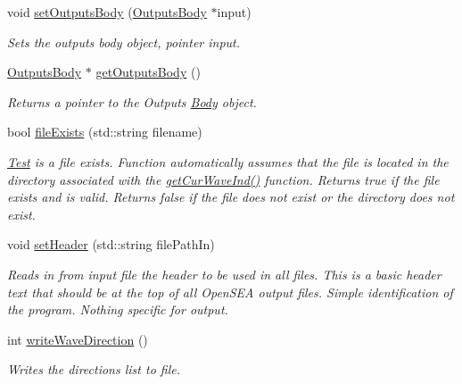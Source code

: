 \begin{DoxyCompactItemize}
void \hyperlink{classosea_1_1ofreq_1_1_file_writer_af0234f3573308ca6f5b7178f662b3993}{set\-Outputs\-Body} (\hyperlink{classosea_1_1ofreq_1_1_outputs_body}{Outputs\-Body} $\ast$input)
\begin{DoxyCompactList}\small\item\em Sets the outputs body object, pointer input. \end{DoxyCompactList}\item 
\hyperlink{classosea_1_1ofreq_1_1_outputs_body}{Outputs\-Body} $\ast$ \hyperlink{classosea_1_1ofreq_1_1_file_writer_a2794a9410be184745cd98f26df801ab2}{get\-Outputs\-Body} ()
\begin{DoxyCompactList}\small\item\em Returns a pointer to the Outputs \hyperlink{classosea_1_1ofreq_1_1_body}{Body} object. \end{DoxyCompactList}\item 
bool \hyperlink{classosea_1_1ofreq_1_1_file_writer_afc22f7afcd30f676e5385133247ed84d}{file\-Exists} (std\-::string filename)
\begin{DoxyCompactList}\small\item\em \hyperlink{class_test}{Test} is a file exists. Function automatically assumes that the file is located in the directory associated with the \hyperlink{classosea_1_1ofreq_1_1_file_writer_a9748d987475a225b49e14f48b8be0cd6}{get\-Cur\-Wave\-Ind()} function. Returns true if the file exists and is valid. Returns false if the file does not exist or the directory does not exist. \end{DoxyCompactList}\item 
void \hyperlink{classosea_1_1ofreq_1_1_file_writer_a310daaf404e9a0ef1f609eaea85e1bb0}{set\-Header} (std\-::string file\-Path\-In)
\begin{DoxyCompactList}\small\item\em Reads in from input file the header to be used in all files. This is a basic header text that should be at the top of all Open\-S\-E\-A output files. Simple identification of the program. Nothing specific for output. \end{DoxyCompactList}\item 
int \hyperlink{classosea_1_1ofreq_1_1_file_writer_af8b7b6236b90e1734161f6158f64482b}{write\-Wave\-Direction} ()
\begin{DoxyCompactList}\small\item\em Writes the directions list to file. \end{DoxyCompactList}\item 

\end{DoxyCompactItemize}
